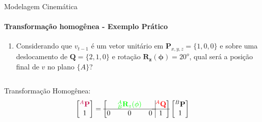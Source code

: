 \documentclass{beamer}
\begin{document}
\begin{frame}{Modelagem Cinemática}
    \framesubtitle{Transformação homogênea - Exemplo Prático}
    \begin{enumerate}
        \item Considerando que $v_{t-1}$ é um vetor unitário em $\mathbf{P}_{x,y,z}=\{1,0,0\}$ e sobre uma deslocamento de $\mathbf{Q}=\{2,1,0\}$ e rotação $\mathbf{R_z(\phi)}=20^o$, qual será a posição final de $v$ no plano $\{A\}$?
    \end{enumerate}
    \begin{columns}
        \begin{column}[c]{0.5\textwidth}
            
        \end{column}
        \begin{column}[c]{0.5\textwidth}
            
        \end{column}
    \end{columns}
    Transformação Homogênea:
    \begin{equation*}
        \begin{bmatrix}
            \color{purple}{{}^A\mathbf{P}} \\ 1
        \end{bmatrix}
        =
        \left[
            \begin{matrix}
                  & \color{green}{{}_B^A\mathbf{R}_z(\phi)} &   \\ \hline
                0 & 0                                       & 0 \\
            \end{matrix} \right.
            \left.
            \vline
            \begin{matrix}
                \color{red}{{}^A\mathbf{Q}} \\ \hline
                1
            \end{matrix} \right]
        \begin{bmatrix}
            {}^B\mathbf{P} \\
            1
        \end{bmatrix}
    \end{equation*}
\end{frame}




\end{document}
